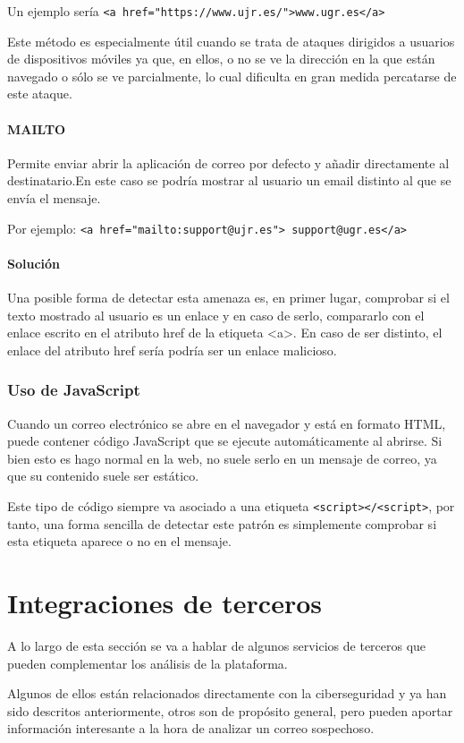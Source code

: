 Un ejemplo sería \verb|<a href="https://www.ujr.es/">www.ugr.es</a>|

Este método es especialmente útil cuando se trata de ataques dirigidos a usuarios de dispositivos móviles ya que, en ellos, o no se ve la dirección en la que están navegado o sólo se ve parcialmente, lo cual dificulta en gran medida percatarse de este ataque. 

\paragraph{MAILTO}
Permite enviar abrir la aplicación de correo por defecto y añadir directamente al destinatario.En este caso se podría mostrar al usuario un email distinto al que se envía el mensaje. 

Por ejemplo: \verb|<a href="mailto:support@ujr.es"> support@ugr.es</a>|

\paragraph{Solución}
Una posible forma de detectar esta amenaza es, en primer lugar, comprobar si el texto mostrado al usuario es un enlace y en caso de serlo, compararlo con el enlace escrito en el atributo href de la etiqueta <a>. En caso de ser distinto, el enlace del atributo href sería podría ser un enlace malicioso. 

\subsubsection{Uso de JavaScript}
Cuando un correo electrónico se abre en el navegador y está en formato HTML, puede contener código JavaScript que se ejecute automáticamente al abrirse. Si bien esto es hago normal en la web, no suele serlo en un mensaje de correo, ya que su contenido suele ser estático. 

Este tipo de código siempre va asociado a una etiqueta \verb|<script></<script>|, por tanto, una forma sencilla de detectar este patrón es simplemente comprobar si esta etiqueta aparece o no en el mensaje. 

\section{Integraciones de terceros}
A lo largo de esta sección se va a hablar de algunos servicios de terceros que pueden complementar los análisis de la plataforma. 

Algunos de ellos están relacionados directamente con la ciberseguridad y ya han sido descritos anteriormente, otros son de propósito general, pero pueden aportar información interesante a la hora de analizar un correo sospechoso. 

